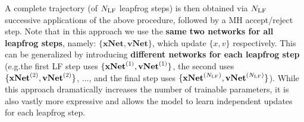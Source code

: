 A complete trajectory (of \({N_{\mathrm{LF}}}\) leapfrog steps) is then obtained via
\({N_{\mathrm{LF}}}\) successive applications of the above procedure, followed by a MH
accept/reject step.
%
Note that in this approach we use the \textbf{same two networks for all
leapfrog steps}, namely: \(\{\mathrm{\mathbf{xNet}}, \mathrm{\mathbf{vNet}}\}\),
which update \(\{x, v\}\) respectively.
%
%
This can be generalized by introducing \textbf{different networks for each
leapfrog step} (e.g.\@ the first LF step uses \(\{\mathrm{\mathbf{xNet}}^{(1)},
\mathrm{\mathbf{vNet}}^{(1)}\}\), the second uses \(\{\mathrm{\mathbf{xNet}}^{(2)}, \mathrm{\mathbf{vNet}}^{(2)}\}\), \(\ldots\), and
the final step uses \(\{\mathrm{\mathbf{xNet}}^{({N_{\mathrm{LF}}})}, \mathrm{\mathbf{vNet}}^{({N_{\mathrm{LF}}})}\}\)).
%
While this approach dramatically increases the number of trainable parameters,
it is also vastly more expressive and allows the model to learn independent
updates for each leapfrog step.
%

